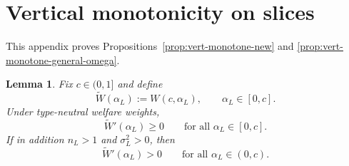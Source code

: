 \documentclass[a4paper,12pt]{article}
\newtheorem{lemma}[theorem]{Lemma}
\theoremstyle{definition}
\theoremstyle{remark}
\newcommand{\1}{\mathbf{1}}
\begin{document}
\section{Vertical monotonicity on slices}
\label{app:vertical}

This appendix proves Propositions~\ref{prop:vert-monotone-new} and
\ref{prop:vert-monotone-general-omega}.



\begin{lemma}
\label{lem:vertical-type-neutral}
Fix \(c\in(0,1]\) and define
\[
\widetilde W(\alpha_L):=W(c,\alpha_L), \qquad \alpha_L\in[0,c].
\]
Under type-neutral welfare weights,
\[
\widetilde W'(\alpha_L)\ge 0
\qquad\text{for all }\alpha_L\in[0,c].
\]
If in addition \(n_L>1\) and \(\sigma_L^2>0\), then
\[
\widetilde W'(\alpha_L)>0
\qquad\text{for all }\alpha_L\in(0,c).
\]
\end{lemma}
\end{document}
